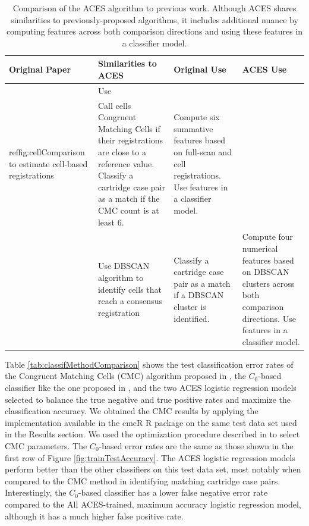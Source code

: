 \documentclass[11pt,]{isuthesis}
\begin{document}
\begin{table}[htbp]
\centering
\begin{tabular}{p{.18\linewidth} p{.23\linewidth} p{.23\linewidth} p{.23\linewidth}}
Original Paper & Similarities to ACES & Original Use & ACES Use \\
\hline
\citet{song_proposed_2013} & Use \\ref{fig:cellComparison} to estimate cell-based registrations & Call cells Congruent Matching Cells if their registrations are close to a reference value. Classify a cartridge case pair as a match if the CMC count is at least 6. & Compute six summative features based on full-scan and cell registrations. Use features in a classifier model. \\
\hline
\citet{Zhang2020} & Use DBSCAN algorithm to identify cells that reach a consensus registration & Classify a cartridge case pair as a match if a DBSCAN cluster is identified. & Compute four numerical features based on DBSCAN clusters across both comparison directions. Use features in a classifier model.
\end{tabular}
\caption{Comparison of the ACES algorithm to previous work. Although ACES shares similarities to previously-proposed algorithms, it includes additional nuance by computing features across both comparison directions and using these features in a classifier model.}
\label{tab:previousWorkComparison}
\end{table}

Table \ref{tab:classifMethodComparison} shows the test classification error rates of the Congruent Matching Cells (CMC) algorithm proposed in \citet{song_proposed_2013}, the \(C_0\)-based classifier like the one proposed in \citet{Zhang2020}, and the two ACES logistic regression models selected to balance the true negative and true positive rates and maximize the classification accuracy.
We obtained the CMC results by applying the implementation available in the cmcR R package \citep{cmcR} on the same test data set used in the Results section.
We used the optimization procedure described in \citet{Zemmels2023} to select CMC parameters.
The \(C_0\)-based error rates are the same as those shown in the first row of Figure \ref{fig:trainTestAccuracy}.
The ACES logistic regression models perform better than the other classifiers on this test data set, most notably when compared to the CMC method in identifying matching cartridge case pairs.
Interestingly, the \(C_0\)-based classifier has a lower false negative error rate compared to the All ACES-trained, maximum accuracy logistic regression model, although it has a much higher false positive rate.
\end{document}

